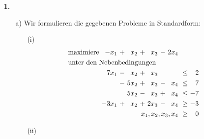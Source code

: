 \documentclass [a4paper,11pt]{article}
\author{\authorinfotitle}
\title{\titleinfo}
\date{\today}
\begin{document}
\maketitle
    \begin{enumerate}
        \item[\textbf{1.}]
            \begin{enumerate}
                \item[a)]
                    Wir formulieren die gegebenen Probleme in Standardform:
                    \begin{enumerate}
                        \item[(i)]
                            \begin{align*}
                            \begin{alignedat}{6}
                            & \text{maximiere } & -x_1 &\ + &\ x_2 &\ + &\ x_3 &\ - &\ 2x_4 & & \\
                            & \rlap{unter den Nebenbedingungen} & & & & & & & & & \\
                            && 7x_1 &\ - &\  x_2 &\ + &\  x_3 &    &       &\ \leq &\ 2 \\
                            &&      &\ - &\ 5x_2 &\ + &\  x_3 &\ - &\  x_4 &\ \leq &\ 7 \\
                            &&      &\  &\ 5x_2 &\ - &\  x_3 &\ + &\  x_4 &\ \leq &\ -7 \\
                            && -3x_1 &\ + &\  x_2 &\ + &\ 2x_3 &\ - &\  x_4 &\ \geq &\ -3 \\
                            && & & & & & & \llap{$x_1, x_2, x_3,x_4$} &\ \geq &\ 0
                            \end{alignedat}
                            \end{align*}
                        \item[(ii)]

\end{enumerate}
\end{enumerate}
\end{enumerate}
\end{document}
